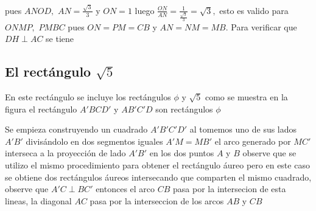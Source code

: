 pues $ANOD,$ $AN=\frac{\sqrt{3}}{3}$ y $ON=1$ luego $\frac{ON}{AN}=\frac{1}{\frac{\sqrt{3}}{3}}=\sqrt{3},$ esto es valido para $ONMP,$ $PMBC$ pues $ON=PM=CB$ y $AN=NM=MB.$ Para verificar que $DH\perp AC$ se tiene

\subsection{El rectángulo $\sqrt{5}$}

En este rectángulo se incluye los rectángulos $\phi$ y $\sqrt{5}$  como se muestra en la figura el rectángulo $A'BCD'$ y $AB'C'D$ son rectángulos $\phi$

Se empieza construyendo un cuadrado $A'B'C'D'$ al tomemos uno de sus lados $A'B'$ divisándolo en dos segmentos iguales $A'M=MB'$ el arco generado por $MC'$ interseca a la proyección de lado $A'B'$ en los dos puntos $A$ y $B$ observe que se utilizo el mismo procedimiento para obtener el rectángulo áureo pero en este caso se obtiene dos rectángulos áureos intersecando que comparten el mismo cuadrado, observe que $A'C\perp BC'$ entonces el arco $CB$ pasa por la intersecion de esta lineas, la diagonal $AC$ pasa por la interseccion de los arcos $AB$ y $CB$

